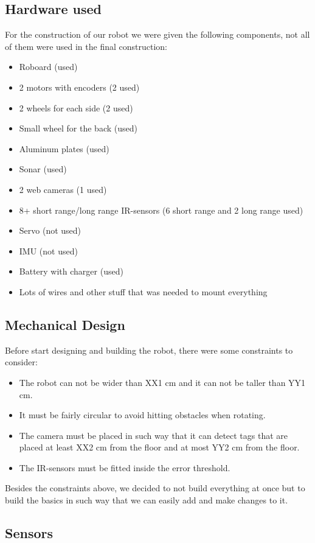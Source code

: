 \subsection{Hardware used}

For the construction of our robot we were given the following components, not all of them were used in the final construction:
\begin{itemize}
\item Roboard (used)
\item 2 motors with encoders (2 used)
\item 2 wheels for each side (2 used)
\item Small wheel for the back (used)
\item Aluminum plates (used)
\item Sonar (used)
\item 2 web cameras (1 used)
\item 8+ short range/long range IR-sensors (6 short range and 2 long range used)
\item Servo (not used)
\item IMU (not used)
\item Battery with charger (used)
\item Lots of wires and other stuff that was needed to mount everything
\end{itemize}


\subsection{Mechanical Design}

Before start designing and building the robot, there were some constraints to consider:
\begin{itemize}
\item The robot can not be wider than XX1 cm and it can not be taller than YY1 cm.
\item It must be fairly circular to avoid hitting obstacles when rotating.
\item The camera must be placed in such way that it can detect tags that are placed at least XX2 cm from the floor and at most YY2 cm from the floor.
\item The IR-sensors must be fitted inside the error threshold.
\end{itemize}
Besides the constraints above, we decided to not build everything at once but to build the basics in such way that we can easily add and make changes to it.

\subsection{Sensors}

